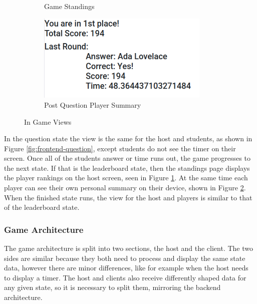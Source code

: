 \documentclass{article}
\begin{document}
\begin{figure}[H]
\begin{subfigure}[b]{0.49\textwidth}
                    \caption{Game Standings}
                    \label{fig:frontend-standings}
                \end{subfigure}
                \begin{subfigure}[b]{0.49\textwidth}
                    \centering
                    \includegraphics[width=0.9\textwidth]{images/frontend-player_summary.png}
                    \caption{Post Question Player Summary}
                    \label{fig:frontend-player_summary}
                \end{subfigure}
                \caption{In Game Views}\label{fig:frontend-user_interface}
            \end{figure}
            
            
	        In the question state the view is the same for the host and students, as shown in Figure \ref{fig:frontend-question}, except students do not see the timer on their screen. Once all of the students answer or time runs out, the game progresses to the next state. If that is the leaderboard state, then the standings page displays the player rankings on the host screen, seen in Figure \ref{fig:frontend-standings}. At the same time each player can see their own personal summary on their device, shown in Figure \ref{fig:frontend-player_summary}. When the finished state runs, the view for the host and players is similar to that of the leaderboard state.
	    
	    \subsubsection{Game Architecture}
            The game architecture is split into two sections, the host and the client. The two sides are similar because they both need to process and display the same state data, however there are minor differences, like for example when the host needs to display a timer. The host and clients also receive differently shaped data for any given state, so it is necessary to split them, mirroring the backend architecture.
            \smallskip
            
\end{document}
